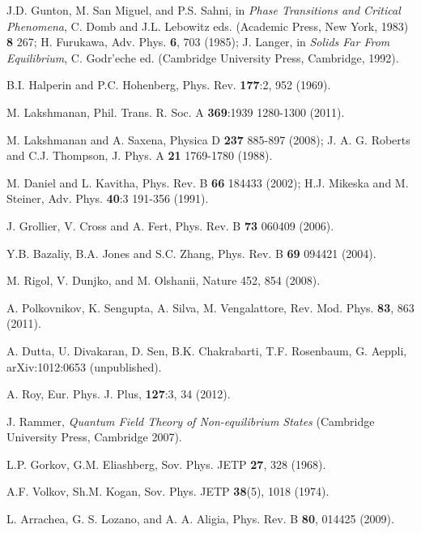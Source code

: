 \documentclass[a4paper,9pt]{article}
\renewenvironment{thebibliography}[1]{%
    \begin{oldthebibliography}{#1}%
      \setlength{\parskip}{0ex}%
      \setlength{\itemsep}{0ex}%
  }%
  {%
    \end{oldthebibliography}%
  }
\begin{document}
\begin{thebibliography}{}

J.D. Gunton, M. San Miguel, and P.S. Sahni, in \textit{Phase Transitions and Critical Phenomena}, C. Domb
and J.L. Lebowitz eds. (Academic Press, New York, 1983)  {\bf 8} 267; H. Furukawa, Adv. Phys. {\bf 6}, 703 (1985);
J. Langer, in \textit{Solids Far From Equilibrium}, C. Godr'eche ed. (Cambridge University Press, Cambridge, 1992).

B.I. Halperin and P.C. Hohenberg, Phys. Rev. {\bf 177}:2, 952 (1969).

M. Lakshmanan,  Phil. Trans. R. Soc. A {\bf 369}:1939 1280-1300 (2011).

M. Lakshmanan and A. Saxena, Physica D {\bf 237} 885-897 (2008); J. A. G. Roberts and C.J. Thompson, J. Phys. A {\bf 21} 1769-1780 (1988).

M. Daniel and L. Kavitha, Phys. Rev. B {\bf 66} 184433 (2002); H.J. Mikeska and M. Steiner, Adv. Phys. {\bf40}:3 191-356 (1991). 

J. Grollier, V. Cross  and A. Fert, Phys. Rev. B {\bf 73} 060409 (2006).

Y.B. Bazaliy, B.A. Jones and S.C. Zhang, Phys. Rev. B {\bf 69} 094421 (2004).

M. Rigol, V. Dunjko, and M. Olshanii, Nature 452, 854 (2008).

A. Polkovnikov, K. Sengupta, A. Silva, M. Vengalattore, Rev. Mod. Phys. \textbf{83}, 863 (2011).

A. Dutta, U. Divakaran, D. Sen, B.K. Chakrabarti, T.F. Rosenbaum, G. Aeppli, arXiv:1012:0653 (unpublished).

A. Roy, Eur. Phys. J. {Plus}, {\bf 127}:3, 34 (2012).

J. Rammer, \textit{Quantum Field Theory of Non-equilibrium States} (Cambridge University Press, Cambridge 2007).

L.P. Gorkov, G.M. Eliashberg, Sov. Phys. JETP \textbf{27}, 328 (1968).

A.F. Volkov, Sh.M. Kogan, Sov. Phys. JETP \textbf{38}(5), 1018 (1974).

L. Arrachea, G. S. Lozano, and A. A. Aligia, Phys. Rev. B {\bf 80}, 014425 (2009).



\end{thebibliography}
\end{document}
